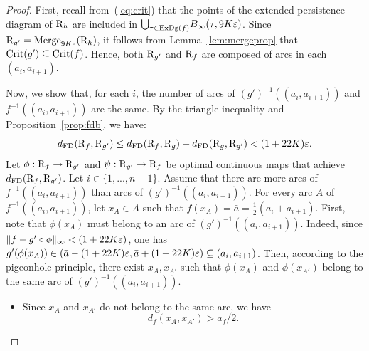 \begin{proof}
First, recall from~(\ref{eq:crit}) that the points of the extended
persistence diagram of $\mathrm{R}_h$ are included in
${\bigcup}_{\tau\in\mathrm{ExDg}(f)} B_\infty(\tau,9K\varepsilon)$.
Since $\mathrm{R}_{g'}=\mathrm{Merge}_{9K\varepsilon}(\mathrm{R}_h)$, 
it follows from Lemma~\ref{lem:mergeprop} that $\mathrm{Crit}(g')\subseteq\mathrm{Crit}(f)$.
Hence, both $\mathrm{R}_{g'}$ and $\mathrm{R}_f$ are composed of arcs in each $(a_i,a_{i+1})$.

Now, we show that, for each $i$, the number of arcs of $(g')^{-1}((a_i,a_{i+1}))$
and $f^{-1}((a_i,a_{i+1}))$ are the same.
By the triangle inequality and Proposition~\ref{prop:fdb}, we have: 
\begin{equation}\label{eq:tri}
d_{\rm FD}(\mathrm{R}_f,\mathrm{R}_{g'}) \leq  d_{\rm FD}(\mathrm{R}_f,\mathrm{R}_g)  + d_{\rm FD}(\mathrm{R}_g,\mathrm{R}_{g'}) < (1+22K)\varepsilon.
\end{equation}
Let $\phi:\mathrm{R}_f\rightarrow\mathrm{R}_{g'}$ and $\psi:\mathrm{R}_{g'}\rightarrow\mathrm{R}_f$
be optimal continuous maps that achieve $d_{\rm FD}(\mathrm{R}_f,\mathrm{R}_{g'})$.
Let $i\in\{1,...,n-1\}$.
Assume that there are more arcs of $f^{-1}((a_i,a_{i+1}))$ 
than arcs of $(g')^{-1}((a_i,a_{i+1}))$. For every arc $A$ of
$f^{-1}((a_i,a_{i+1}))$, let $x_A\in A$ such that $f(x_A)=\bar{a}=\frac{1}{2}(a_i+a_{i+1})$.
%
First, note that $\phi(x_A)$ must belong to an arc of 
$(g')^{-1}((a_i,a_{i+1}))$. Indeed, since $\|f-g'\circ\phi\|_\infty < (1+22K\varepsilon)$,
one has $g'(\phi(x_A))\in(\bar{a}-(1+22K)\varepsilon,\bar{a}+(1+22K)\varepsilon)\subseteq(a_i,a_{i+1})$.
%
Then, according to the pigeonhole principle,
there exist $x_A,x_{A'}$ such that $\phi(x_A)$ and $\phi(x_{A'})$
belong to the same arc of $(g')^{-1}((a_i,a_{i+1}))$.
%
\begin{itemize}
\item Since $x_A$ and $x_{A'}$ do not belong to the same arc, we have
$$d_f(x_{A},x_{A'}) > a_f/2.$$


\end{itemize}
\end{proof}
